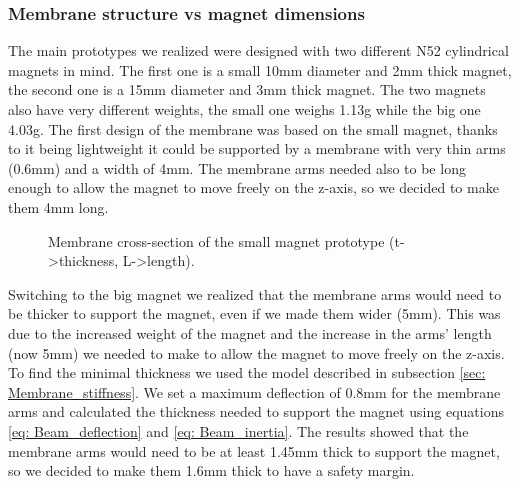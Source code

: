\subsubsection{Membrane structure vs magnet dimensions}
The main prototypes we realized were designed with two different N52 cylindrical magnets in mind.
The first one is a small 10mm diameter and 2mm thick magnet, the second one is a 15mm diameter and 3mm thick magnet.
The two magnets also have very different weights, the small one weighs 1.13g while the big one 4.03g.
The first design of the membrane was based on the small magnet, thanks to it being lightweight it could be supported by a membrane with very thin arms (0.6mm) and a width of 4mm.
The membrane arms needed also to be long enough to allow the magnet to move freely on the z-axis, so we decided to make them 4mm long.
\begin{figure}
    \centering
    \caption{Membrane cross-section of the small magnet prototype (t->thickness, L->length).}
    \label{fig: Membrane_v1_section}
\end{figure}

Switching to the big magnet we realized that the membrane arms would need to be thicker to support the magnet, even if we made them wider (5mm).
This was due to the increased weight of the magnet and the increase in the arms' length (now 5mm) we needed to make to allow the magnet to move freely on the z-axis.
To find the minimal thickness we used the model described in subsection \ref{sec: Membrane_stiffness}.
We set a maximum deflection of 0.8mm for the membrane arms and calculated the thickness needed to support the magnet using equations \ref{eq: Beam_deflection} and \ref{eq: Beam_inertia}.
The results showed that the membrane arms would need to be at least 1.45mm thick to support the magnet, so we decided to make them 1.6mm thick to have a safety margin.


